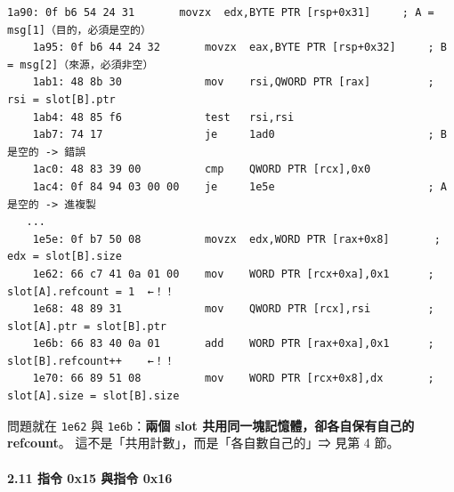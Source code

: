 \documentclass[10pt,a4paper]{article}
\begin{document}
\begin{Verbatim}[breaklines=true,breakanywhere=true,breakautoindent=false,fontsize=\fontsize{7.0}{9.5}\selectfont]
    1a90: 0f b6 54 24 31       movzx  edx,BYTE PTR [rsp+0x31]     ; A = msg[1]（目的，必須是空的）
    1a95: 0f b6 44 24 32       movzx  eax,BYTE PTR [rsp+0x32]     ; B = msg[2]（來源，必須非空）
    1ab1: 48 8b 30             mov    rsi,QWORD PTR [rax]         ; rsi = slot[B].ptr
    1ab4: 48 85 f6             test   rsi,rsi
    1ab7: 74 17                je     1ad0                        ; B 是空的 -> 錯誤
    1ac0: 48 83 39 00          cmp    QWORD PTR [rcx],0x0
    1ac4: 0f 84 94 03 00 00    je     1e5e                        ; A 是空的 -> 進複製
   ...
    1e5e: 0f b7 50 08          movzx  edx,WORD PTR [rax+0x8]       ; edx = slot[B].size
    1e62: 66 c7 41 0a 01 00    mov    WORD PTR [rcx+0xa],0x1      ; slot[A].refcount = 1  ←！！ 
    1e68: 48 89 31             mov    QWORD PTR [rcx],rsi         ; slot[A].ptr = slot[B].ptr
    1e6b: 66 83 40 0a 01       add    WORD PTR [rax+0xa],0x1      ; slot[B].refcount++    ←！！
    1e70: 66 89 51 08          mov    WORD PTR [rcx+0x8],dx       ; slot[A].size = slot[B].size
\end{Verbatim}

問題就在 \texttt{1e62} 與 \texttt{1e6b}：\textbf{兩個 slot
共用同一塊記憶體，卻各自保有自己的 refcount}。
這不是「共用計數」，而是「各自數自己的」⇒ 見第 4 節。

\paragraph{2.11 指令 0x15 與指令
0x16}\label{ux6307ux4ee4-0x15-ux8207ux6307ux4ee4-0x16}
\end{document}
